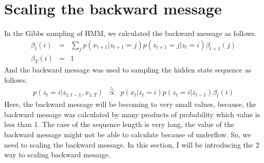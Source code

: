 \documentclass[a4paper]{article}
\newcommand{\proptoas}[1]{\overset{#1}{\propto}}
\begin{document}
\section{Scaling the backward message}
In the Gibbs sampling of HMM, we calculated the backward message as follows.
\begin{eqnarray}
	\beta_t(i) &=& \sum_{j}{p(x_{t+1} | z_{t+1} = j) p(z_{t+1} = j | z_{t} = i) \beta_{t+1}(j)} \\
	\beta_T(i) &=& 1
\end{eqnarray}
And the backward message was used to sampling the hidden state sequence as follows.
\begin{eqnarray}
	p(z_{t} = i | z_{1:t-1}, x_{1:T})
	&\proptoas{z_t}&
	p(x_t | z_t = i) p(z_t = i | z_{t-1}) \beta_t(i)
\end{eqnarray}
Here, the backward message will be becoming to very small values, because, the backward message was calculated by many products of probability which value is less than 1.
The case of the sequence length is very long, the value of the backward message might not be able to calculate because of underflow.
So, we need to scaling the backward message.
In this section, I will be introducing the 2 way to scaling backward message.
\end{document}
